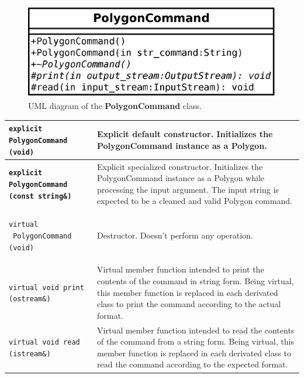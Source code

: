 \documentclass[11pt,twoside,openany,x11names,svgnames]{memoir}
\begin{document}
\begin{figure}
	\centering
	\includegraphics[scale=0.2, clip=true, trim= 0pt 0pt 0pt 0pt]{images/chapter03-image19}
	\caption{UML diagram of the \textbf{PolygonCommand} class.}
	\label{fig:class-polygon-command}
\end{figure}

\begin{table}[h]\footnotesize
\centering
\begin{tabular}{| >{\bfseries}p{7.5cm} | p{8cm} |}
	\hline
	
	\texttt{explicit PolygonCommand (void)} & Explicit default constructor. Initializes the PolygonCommand instance as a Polygon. \\
	
	\hline
	
	\texttt{explicit PolygonCommand (const string\&)} & Explicit specialized constructor. Initializes the PolygonCommand instance as a Polygon while processing the input argument. The input string is expected to be a cleaned and valid Polygon command. \\
	
	\hline
	
	\texttt{virtual ~PolygonCommand (void)} & Destructor. Doesn't perform any operation. \\
	
	\hline
	
	\texttt{virtual void print (ostream\&)} & Virtual member function intended to print the contents of the command in string form. Being virtual, this member function is replaced in each derivated class to print the command according to the actual format. \\
	
	\hline
	
	\texttt{virtual void read (istream\&)} & Virtual member function intended to read the contents of the command from a string form. Being virtual, this member function is replaced in each derivated class to read the command according to the expected format. \\
	

\end{tabular}
\end{table}
\end{document}
